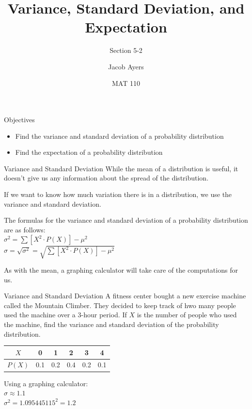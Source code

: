 \documentclass[t, aspectratio=169]{beamer}
\title[5-2b]{Variance, Standard Deviation, and Expectation}
\subtitle{Section 5-2}
\author{Jacob Ayers}
\institute{Lesson \#15}
\date{MAT 110}
\newcommand{\fb}[1]{\left[{#1}\right]} %
\newcommand{\?}{\stackrel{?}{=}}
\begin{document}
	
	\begin{frame}
		\titlepage
	\end{frame}
	
	\begin{frame}{Objectives}
		\begin{itemize}
			\item Find the variance and standard deviation of a probability distribution
			\item Find the expectation of a probability distribution
		\end{itemize}
	\end{frame}

	\begin{frame}{Variance and Standard Deviation}
		While the mean of a distribution is useful, it doesn't give us any information about the spread of the distribution.
		
		If we want to know how much variation there is in a distribution, we use the variance and standard deviation. \pause
		
		The formulas for the variance and standard deviation of a probability distribution are as follows: \\
		
		$\sigma^2 = \sum\fb{X^2 \cdot P(X)} - \mu^2$ \\
		$\sigma = \sqrt{\sigma^2} = \sqrt{\sum\fb{X^2 \cdot P(X)} - \mu^2}$
		
		As with the mean, a graphing calculator will take care of the computations for us.
	\end{frame}

	\begin{frame}{Variance and Standard Deviation}
		A fitness center bought a new exercise machine called the Mountain Climber. They decided to keep track of hwo many people used the machine over a 3-hour period. If $X$ is the number of people who used the machine, find the variance and standard deviation of the probability distribution.
		
		\begin{tabular}{c|ccccc}
			$X$ & 0 & 1 & 2 & 3 & 4 \\ \hline
			$P(X)$ & 0.1 & 0.2 & 0.4 & 0.2 & 0.1
		\end{tabular} \pause
	
		Using a graphing calculator: \pause \\
		$\sigma \approx 1.1$ \pause \\
		$\sigma^2 = 1.095445115^2 = 1.2$ \pause
	\end{frame}
\end{document}
